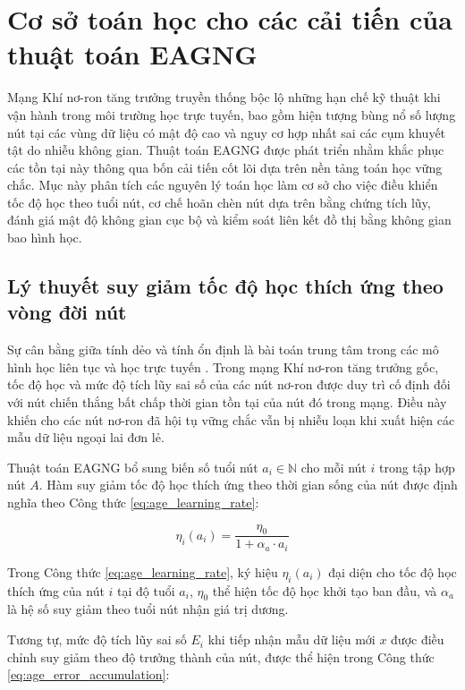 \section{Cơ sở toán học cho các cải tiến của thuật toán EAGNG}

Mạng Khí nơ-ron tăng trưởng truyền thống bộc lộ những hạn chế kỹ thuật khi vận hành trong môi trường học trực tuyến, bao gồm hiện tượng bùng nổ số lượng nút tại các vùng dữ liệu có mật độ cao và nguy cơ hợp nhất sai các cụm khuyết tật do nhiễu không gian. Thuật toán EAGNG được phát triển nhằm khắc phục các tồn tại này thông qua bốn cải tiến cốt lõi dựa trên nền tảng toán học vững chắc. Mục này phân tích các nguyên lý toán học làm cơ sở cho việc điều khiển tốc độ học theo tuổi nút, cơ chế hoãn chèn nút dựa trên bằng chứng tích lũy, đánh giá mật độ không gian cục bộ và kiểm soát liên kết đồ thị bằng không gian bao hình học.

\subsection{Lý thuyết suy giảm tốc độ học thích ứng theo vòng đời nút}

Sự cân bằng giữa tính dẻo và tính ổn định là bài toán trung tâm trong các mô hình học liên tục và học trực tuyến \cite{grossberg1987competitive}. Trong mạng Khí nơ-ron tăng trưởng gốc, tốc độ học và mức độ tích lũy sai số của các nút nơ-ron được duy trì cố định đối với nút chiến thắng bất chấp thời gian tồn tại của nút đó trong mạng. Điều này khiến cho các nút nơ-ron đã hội tụ vững chắc vẫn bị nhiễu loạn khi xuất hiện các mẫu dữ liệu ngoại lai đơn lẻ.

Thuật toán EAGNG bổ sung biến số tuổi nút $a_i \in \mathbb{N}$ cho mỗi nút $i$ trong tập hợp nút $A$. Hàm suy giảm tốc độ học thích ứng theo thời gian sống của nút được định nghĩa theo Công thức \ref{eq:age_learning_rate}:

\begin{equation}
\eta_i(a_i) = \frac{\eta_0}{1 + \alpha_a \cdot a_i}
\label{eq:age_learning_rate}
\end{equation}

Trong Công thức \ref{eq:age_learning_rate}, ký hiệu $\eta_i(a_i)$ đại diện cho tốc độ học thích ứng của nút $i$ tại độ tuổi $a_i$, $\eta_0$ thể hiện tốc độ học khởi tạo ban đầu, và $\alpha_a$ là hệ số suy giảm theo tuổi nút nhận giá trị dương.

Tương tự, mức độ tích lũy sai số $E_i$ khi tiếp nhận mẫu dữ liệu mới $x$ được điều chỉnh suy giảm theo độ trưởng thành của nút, được thể hiện trong Công thức \ref{eq:age_error_accumulation}:

